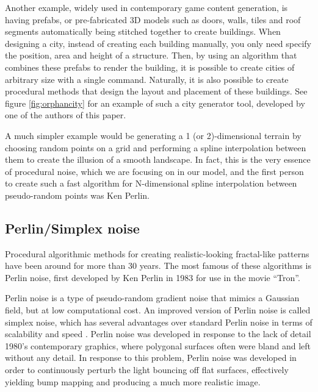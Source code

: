 \documentclass[aps,pre,twocolumn,letterpaper,floatfix,showpacs]{revtex4}
\begin{document}
Another example, widely used in contemporary game content generation, is having prefabs, or pre-fabricated 3D models such as doors, walls, tiles and roof segments automatically being stitched together to create buildings.
When designing a city, instead of creating each building manually, you only need specify the position, area and height of a structure.
Then, by using an algorithm that combines these prefabs to render the building, it is possible to create cities of arbitrary size with a single command.
Naturally, it is also possible to create procedural methods that design the layout and placement of these buildings.
See figure \ref{fig:orphancity} for an example of such a city generator tool, developed by one of the authors of this paper.

A much simpler example would be generating a 1 (or 2)-dimensional terrain by choosing random points on a grid and performing a spline interpolation between them to create the illusion of a smooth landscape.
In fact, this is the very essence of procedural noise, which we are focusing on in our model, and the first person to create such a fast algorithm for N-dimensional spline interpolation between pseudo-random points was Ken Perlin\cite{perlin1985image}.

\subsection{Perlin/Simplex noise}
\label{sec:perlin}

Procedural algorithmic methods for creating realistic-looking
fractal-like patterns have been around for more than 30 years. The most famous of these
algorithms is Perlin noise, first developed by Ken Perlin in 1983 for
use in the movie ``Tron''\cite{perlin1985image}. 

Perlin noise is a type of pseudo-random gradient noise that mimics a Gaussian field, but at low computational cost.
An improved version of Perlin noise is called simplex noise, which has several advantages over standard Perlin noise in terms of scalability and speed \cite{perlin:2002}.
Perlin noise was developed in response to the lack of detail 1980's contemporary graphics, where polygonal surfaces often were bland and left without any detail.
In response to this problem, Perlin noise was developed in order to continuously perturb the light bouncing off flat surfaces, effectively yielding bump mapping and producing a much more realistic image.
\end{document}

